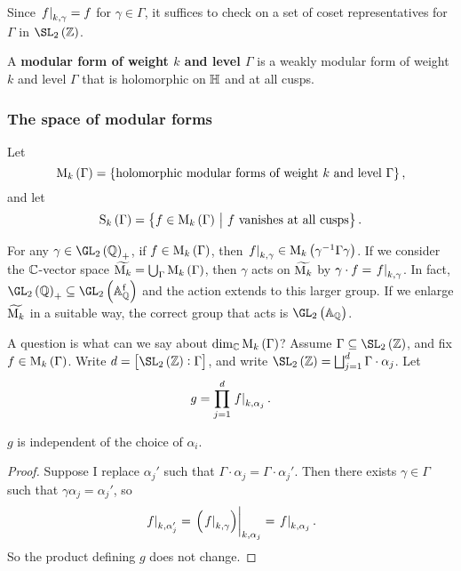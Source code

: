 \begin{note*}
Since $ \left. f \right|_{k, \gamma} = f $ for $ \gamma \in \Gamma $, it suffices to check on a set of coset representatives for $ \Gamma $ in $ \SL_2\br{\ZZ} $.
\end{note*}

\begin{definition}
A \textbf{modular form of weight $ k $ and level $ \Gamma $} is a weakly modular form of weight $ k $ and level $ \Gamma $ that is holomorphic on $ \mathbb{H} $ and at all cusps.
\end{definition}

\pagebreak

\subsubsection{The space of modular forms}


Let
$$ \M_k\br{\Gamma} = \cbr{\text{holomorphic modular forms of weight} \ k \ \text{and level} \ \Gamma}, $$
and let
$$ \S_k\br{\Gamma} = \cbr{f \in \M_k\br{\Gamma} \st f \ \text{vanishes at all cusps}}. $$

\begin{note*}
For any $ \gamma \in \GL_2\br{\QQ}_+ $, if $ f \in \M_k\br{\Gamma} $, then $ \eval{f}_{k, \gamma} \in \M_k\br{\gamma^{-1}\Gamma\gamma} $. If we consider the $ \mathbb{C} $-vector space $ \widetilde{\M_k} = \bigcup_\Gamma \M_k\br{\Gamma} $, then $ \gamma $ acts on $ \widetilde{\mathrm{M}_k} $ by $ \gamma \cdot f = \left. f \right|_{k, \gamma} $. In fact, $ \GL_2\br{\QQ}_+ \subseteq \GL_2\br{\AA_\QQ^\f} $ and the action extends to this larger group. If we enlarge $ \widetilde{\mathrm{M}_k} $ in a suitable way, the correct group that acts is $ \GL_2\br{\AA_\QQ} $.
\end{note*}

A question is what can we say about $ \dim_\CC \M_k\br{\Gamma} $? Assume $ \Gamma \subseteq \SL_2\br{\ZZ} $, and fix $ f \in \M_k\br{\Gamma} $. Write $ d = \sbr{\SL_2\br{\ZZ} : \Gamma} $, and write $ \SL_2\br{\ZZ} = \bigsqcup_{j = 1}^d \Gamma \cdot \alpha_j $. Let
$$ g = \prod_{j = 1}^d \left. f \right|_{k, \alpha_j}. $$

\begin{proposition}
$ g $ is independent of the choice of $ \alpha_i $.
\end{proposition}

\begin{proof}
Suppose I replace $ \alpha_j' $ such that $ \Gamma \cdot \alpha_j = \Gamma \cdot \alpha_j' $. Then there exists $ \gamma \in \Gamma $ such that $ \gamma\alpha_j = \alpha_j' $, so
$$ \eval{f}_{k, \alpha_j'} = \eval{\br{\eval{f}_{k, \gamma}}}_{k, \alpha_j} = \eval{f}_{k, \alpha_j}. $$
So the product defining $ g $ does not change.
\end{proof}

